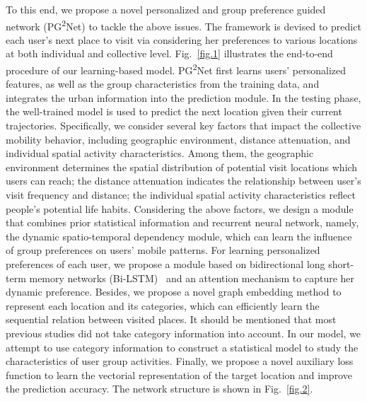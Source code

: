 \documentclass[10pt,journal,compsoc]{IEEEtran}
\begin{document}
To this end, we propose a novel personalized and group preference guided network (PG\textsuperscript{2}Net) to tackle the above issues. The framework is devised to predict each user's next place to visit via considering her preferences to various locations at both individual and collective level. Fig.~\ref{fig.1} illustrates the end-to-end procedure of our learning-based model. PG\textsuperscript{2}Net first learns users' personalized features, as well as the group characteristics from the training data, and integrates the urban information into the prediction module. In the testing phase, the well-trained model is used to predict the next location given their current trajectories. 
Specifically, we consider several key factors that impact the collective mobility behavior, including geographic environment, distance attenuation, and individual spatial activity characteristics. Among them, the geographic environment determines the spatial distribution of potential visit locations which users can reach; the distance attenuation indicates the relationship between user's visit frequency and distance; the individual spatial activity characteristics reflect people’s potential life habits. Considering the above factors, we design a module that combines prior statistical information and recurrent neural network, namely, the dynamic spatio-temporal dependency module, which can learn the influence of group preferences on users' mobile patterns. For learning personalized preferences of each user, we propose a module based on bidirectional long short-term memory networks (Bi-LSTM)~\cite{huang2015bidirectional} and an attention mechanism to capture her dynamic preference. Besides, we propose a novel graph embedding method to represent each location and its categories, which can efficiently learn the sequential relation between visited places. It should be mentioned that most previous studies did not take category information into account. In our model, we attempt to use category information to construct a statistical model to study the characteristics of user group activities. Finally, we propose a novel auxiliary loss function to learn the vectorial representation of the target location and improve the prediction accuracy. The network structure is shown in Fig.~\ref{fig.2}.
\end{document}
